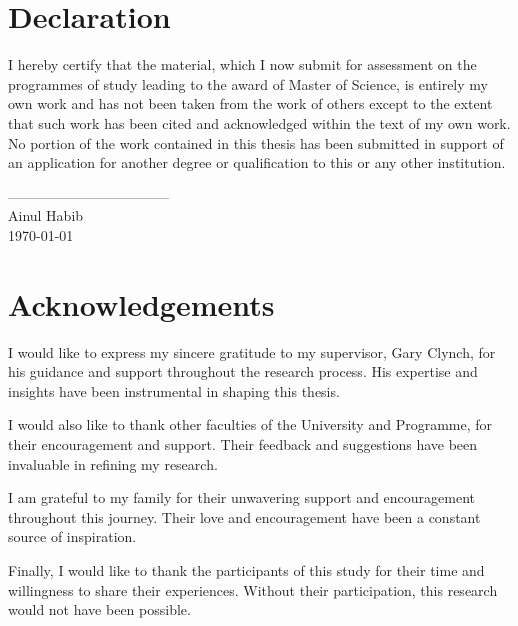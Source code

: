 \documentclass{article}
\begin{document}
\section*{Declaration}
\begin{flushleft}
I hereby certify that the material, which I now submit for assessment on the programmes of study leading to the award of Master of Science, is entirely my own work and has not been taken from the work of others except to the extent that such work has been cited and acknowledged within the text of my own work. No portion of the work contained in this thesis has been submitted in support of an application for another degree or qualification to this or any other institution.
\end{flushleft}
\vspace{2cm}
\begin{flushright}
-----------------------------------\\
Ainul Habib\\
\today
\end{flushright}
\pagebreak

\section*{Acknowledgements}
 
 I would like to express my sincere gratitude to my supervisor, Gary Clynch, for his guidance and support throughout the research process. His expertise and insights have been instrumental in shaping this thesis.

I would also like to thank other faculties of the University and Programme, for their encouragement and support. Their feedback and suggestions have been invaluable in refining my research.

I am grateful to my family for their unwavering support and encouragement throughout this journey. Their love and encouragement have been a constant source of inspiration.

Finally, I would like to thank the participants of this study for their time and willingness to share their experiences. Without their participation, this research would not have been possible.
\pagebreak

\listoffigures
\pagebreak
 

\pagebreak
\tableofcontents
\pagebreak
\end{document}
